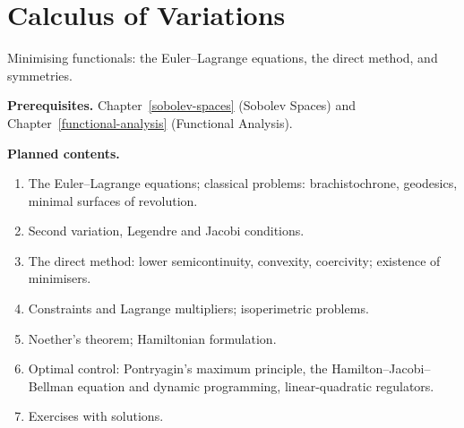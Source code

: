\chapter{Calculus of Variations}\label{calculus-of-variations}

Minimising functionals: the Euler--Lagrange equations, the direct method, and symmetries.

\noindent\textbf{Prerequisites.} Chapter~\ref{sobolev-spaces} (Sobolev Spaces) and Chapter~\ref{functional-analysis} (Functional Analysis).

\noindent\textbf{Planned contents.}
\begin{enumerate}
\item The Euler--Lagrange equations; classical problems: brachistochrone, geodesics, minimal surfaces of revolution.
\item Second variation, Legendre and Jacobi conditions.
\item The direct method: lower semicontinuity, convexity, coercivity; existence of minimisers.
\item Constraints and Lagrange multipliers; isoperimetric problems.
\item Noether's theorem; Hamiltonian formulation.
\item Optimal control: Pontryagin's maximum principle, the Hamilton--Jacobi--Bellman equation and dynamic programming, linear-quadratic regulators.
\item Exercises with solutions.
\end{enumerate}
